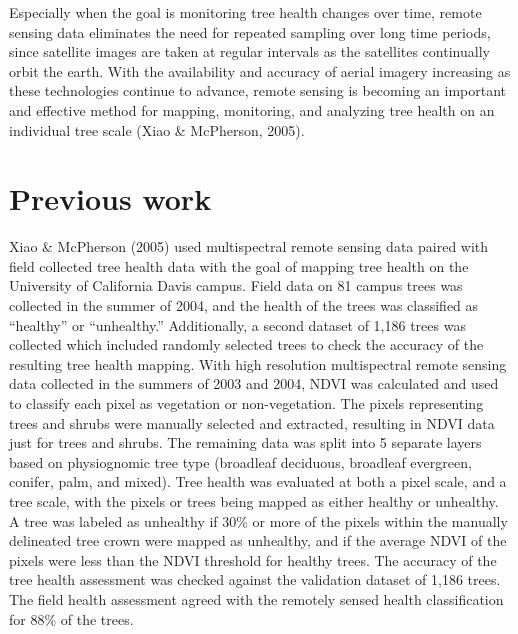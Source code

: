 \documentclass[12pt,twoside]{reedthesis}
\begin{document}
Especially when the goal is monitoring tree health changes over time, remote sensing data eliminates the need for repeated sampling over long time periods, since satellite images are taken at regular intervals as the satellites continually orbit the earth. With the availability and accuracy of aerial imagery increasing as these technologies continue to advance, remote sensing is becoming an important and effective method for mapping, monitoring, and analyzing tree health on an individual tree scale (Xiao \& McPherson, 2005).

\hypertarget{previous-work}{%
\section{Previous work}\label{previous-work}}

Xiao \& McPherson (2005) used multispectral remote sensing data paired with field collected tree health data with the goal of mapping tree health on the University of California Davis campus. Field data on 81 campus trees was collected in the summer of 2004, and the health of the trees was classified as ``healthy'' or ``unhealthy.'' Additionally, a second dataset of 1,186 trees was collected which included randomly selected trees to check the accuracy of the resulting tree health mapping. With high resolution multispectral remote sensing data collected in the summers of 2003 and 2004, NDVI was calculated and used to classify each pixel as vegetation or non-vegetation. The pixels representing trees and shrubs were manually selected and extracted, resulting in NDVI data just for trees and shrubs. The remaining data was split into 5 separate layers based on physiognomic tree type (broadleaf deciduous, broadleaf evergreen, conifer, palm, and mixed). Tree health was evaluated at both a pixel scale, and a tree scale, with the pixels or trees being mapped as either healthy or unhealthy. A tree was labeled as unhealthy if 30\% or more of the pixels within the manually delineated tree crown were mapped as unhealthy, and if the average NDVI of the pixels were less than the NDVI threshold for healthy trees. The accuracy of the tree health assessment was checked against the validation dataset of 1,186 trees. The field health assessment agreed with the remotely sensed health classification for 88\% of the trees.
\end{document}
